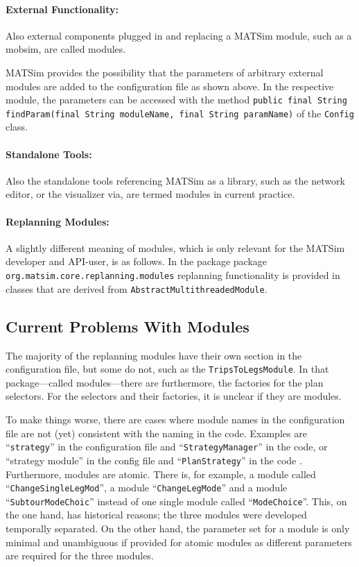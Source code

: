 \paragraph{External Functionality:} %
Also external components plugged in and replacing a MATSim module, such as a mobsim, are called modules.

MATSim provides the possibility that the parameters of arbitrary external modules are added to the configuration file as shown above. In the respective module, the parameters can be accessed with the method \lstinline|public final String findParam(final String moduleName, final String paramName)| of the \lstinline|Config| class.

\paragraph{Standalone Tools:} %
Also the standalone tools referencing MATSim as a library, such as the network editor, or the visualizer via, are termed modules in current practice.

\paragraph{Replanning Modules:} %
A slightly different meaning of modules, which is only relevant for the MATSim developer and API-user, is as follows. In the package package \lstinline|org.matsim.core.replanning.modules| replanning functionality is provided in classes that are derived from \lstinline|AbstractMultithreadedModule|.

\subsection{Current Problems With Modules}
The majority of the replanning modules have their own section in the configuration file, but some do not, such as the \lstinline|TripsToLegsModule|. In that package---called modules---there are furthermore, the factories for the plan selectors. For the selectors and their factories, it is unclear if they are modules.

To make things worse, there are cases where module names in the configuration file are not (yet) consistent with the naming in the code. Examples are ``\lstinline|strategy|'' in the configuration file and ``\lstinline|StrategyManager|'' in the code, or ``strategy module'' in the config file and ``\lstinline|PlanStrategy|'' in the code . Furthermore, modules are atomic. There is, for example, a module called ``\lstinline|ChangeSingleLegMod|'', a module ``\lstinline|ChangeLegMode|'' and a module ``\lstinline|SubtourModeChoic|'' instead of one single module called ``\lstinline|ModeChoice|''. This, on the one hand, has historical reasons; the three modules were developed temporally separated. On the other hand, the parameter set for a module is only minimal and unambiguous if provided for atomic modules as different parameters are required for the three modules.

